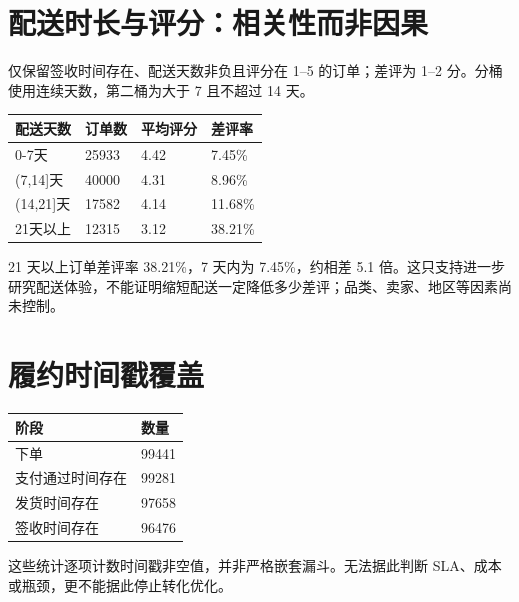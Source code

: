 \documentclass[11pt]{ctexart}
\begin{document}
\section{配送时长与评分：相关性而非因果}
仅保留签收时间存在、配送天数非负且评分在 1--5 的订单；差评为 1--2 分。分桶使用连续天数，第二桶为大于 7 且不超过 14 天。
\begin{center}
\small
\begin{tabular}{llll}
\toprule
配送天数 & 订单数 & 平均评分 & 差评率 \\
\midrule
0-7天 & 25933 & 4.42 & 7.45\% \\
(7,14]天 & 40000 & 4.31 & 8.96\% \\
(14,21]天 & 17582 & 4.14 & 11.68\% \\
21天以上 & 12315 & 3.12 & 38.21\% \\
\bottomrule
\end{tabular}
\end{center}
\begin{center}\end{center}
21 天以上订单差评率 38.21\%，7 天内为 7.45\%，约相差 5.1 倍。这只支持进一步研究配送体验，不能证明缩短配送一定降低多少差评；品类、卖家、地区等因素尚未控制。

\section{履约时间戳覆盖}
\begin{center}
\small
\begin{tabular}{ll}
\toprule
阶段 & 数量 \\
\midrule
下单 & 99441 \\
支付通过时间存在 & 99281 \\
发货时间存在 & 97658 \\
签收时间存在 & 96476 \\
\bottomrule
\end{tabular}
\end{center}
这些统计逐项计数时间戳非空值，并非严格嵌套漏斗。无法据此判断 SLA、成本或瓶颈，更不能据此停止转化优化。
\newpage
\end{document}
